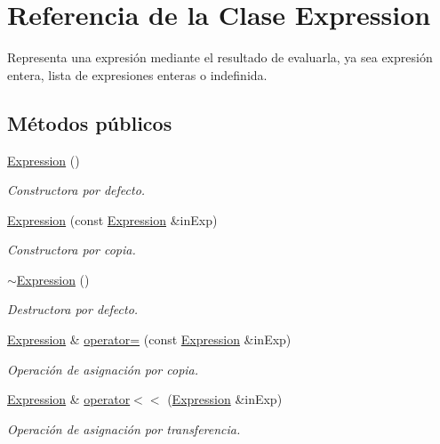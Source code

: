\hypertarget{class_expression}{}\section{Referencia de la Clase Expression}
\label{class_expression}


Representa una expresión mediante el resultado de evaluarla, ya sea expresión entera, lista de expresiones enteras o indefinida.  


\subsection*{Métodos públicos}
\begin{DoxyCompactItemize}
\item 
\hyperlink{class_expression_afcf87716bf0abfe8d414c92529e1564a}{Expression} ()
\begin{DoxyCompactList}\small\item\em Constructora por defecto. \end{DoxyCompactList}\item 
\hyperlink{class_expression_ae84af9ba2a88741d6f65a70ef8869faf}{Expression} (const \hyperlink{class_expression}{Expression} \&in\+Exp)
\begin{DoxyCompactList}\small\item\em Constructora por copia. \end{DoxyCompactList}\item 
\hyperlink{class_expression_a3e99570b177da619eeb2c5787cbb148e}{$\sim$\+Expression} ()
\begin{DoxyCompactList}\small\item\em Destructora por defecto. \end{DoxyCompactList}\item 
\hyperlink{class_expression}{Expression} \& \hyperlink{class_expression_a674ab908807d385df298e12762e4220a}{operator=} (const \hyperlink{class_expression}{Expression} \&in\+Exp)
\begin{DoxyCompactList}\small\item\em Operación de asignación por copia. \end{DoxyCompactList}\item 
\hyperlink{class_expression}{Expression} \& \hyperlink{class_expression_a39021db3a461adc4e2b46c55ffd0e991}{operator$<$$<$} (\hyperlink{class_expression}{Expression} \&in\+Exp)
\begin{DoxyCompactList}\small\item\em Operación de asignación por transferencia. \end{DoxyCompactList}\item 

\end{DoxyCompactItemize}
